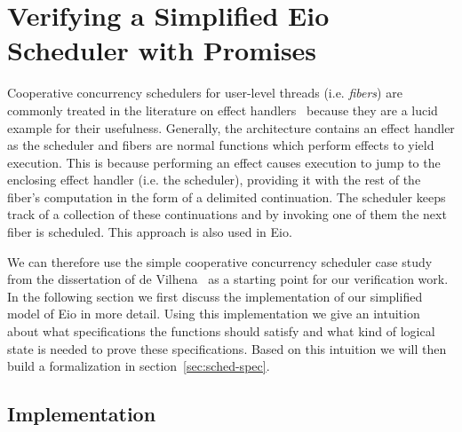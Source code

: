 \section{Verifying a Simplified Eio Scheduler with Promises}
\label{sec:scheduler}


Cooperative concurrency schedulers for user-level threads (i.e. \emph{fibers}) are commonly treated in the literature on effect handlers~\cite{dolan2018concurrent,leijen2017structured,de2021separation} because they are a lucid example for their usefulness.
Generally, the architecture contains an effect handler as the scheduler and fibers are normal functions which perform effects to yield execution.
This is because performing an effect causes execution to jump to the enclosing effect handler (i.e. the scheduler), providing it with the rest of the fiber's computation in the form of a delimited continuation.
The scheduler keeps track of a collection of these continuations and by invoking one of them the next fiber is scheduled.
This approach is also used in Eio.

We can therefore use the simple cooperative concurrency scheduler case study from the dissertation of de Vilhena~\cite{de2022proof} as a starting point for our verification work.
In the following section we first discuss the implementation of our simplified model of Eio in more detail.
Using this implementation we give an intuition about what specifications the functions should satisfy and what kind of logical state is needed to prove these specifications.
Based on this intuition we will then build a formalization in section~\ref{sec:sched-spec}.

\subsection{Implementation}
\label{sec:sched-impl}

